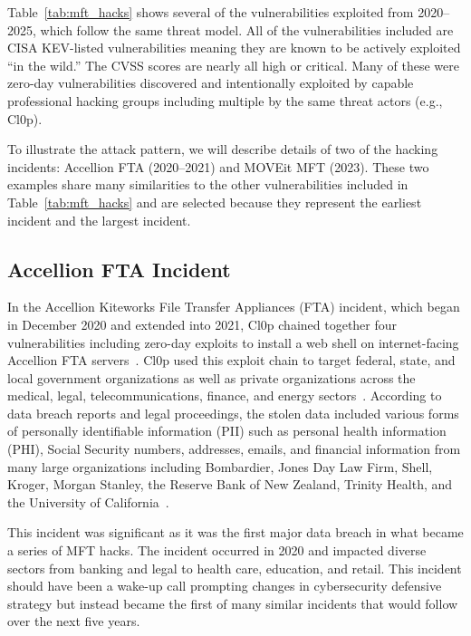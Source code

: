 Table~\ref{tab:mft_hacks} shows several of the vulnerabilities exploited from 2020--2025, which follow the same threat model. All of the vulnerabilities included are CISA KEV-listed vulnerabilities meaning they are known to be actively exploited ``in the wild.'' The CVSS scores are nearly all high or critical. Many of these were zero-day vulnerabilities discovered and intentionally exploited by capable professional hacking groups including multiple by the same threat actors (e.g., Cl0p).



To illustrate the attack pattern, we will describe details of two of the hacking incidents: Accellion FTA (2020--2021) and MOVEit MFT (2023). These two examples share many similarities to the other vulnerabilities included in Table~\ref{tab:mft_hacks} and are selected because they represent the earliest incident and the largest incident.

\subsection{Accellion FTA Incident}
\label{sec:accellion}

In the Accellion Kiteworks File Transfer Appliances (FTA) incident, which began in December 2020 and extended into 2021, Cl0p chained together four vulnerabilities including zero-day exploits to install a web shell on internet-facing Accellion FTA servers~\cite{cisa_cl0p_2023}. Cl0p used this exploit chain to target federal, state, and local government organizations as well as private organizations across the medical, legal, telecommunications, finance, and energy sectors~\cite{cisa_accellion}. According to data breach reports and legal proceedings, the stolen data included various forms of personally identifiable information (PII) such as personal health information (PHI), Social Security numbers, addresses, emails, and financial information from many large organizations including Bombardier, Jones Day Law Firm, Shell, Kroger, Morgan Stanley, the Reserve Bank of New Zealand, Trinity Health, and the University of California~\cite{msspalert_accellion}.

This incident was significant as it was the first major data breach in what became a series of MFT hacks. The incident occurred in 2020 and impacted diverse sectors from banking and legal to health care, education, and retail. This incident should have been a wake-up call prompting changes in cybersecurity defensive strategy but instead became the first of many similar incidents that would follow over the next five years.


